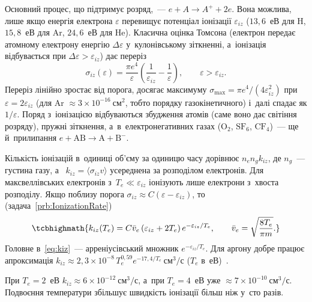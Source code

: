 Основний процес, що підтримує розряд,~--- 
$e+A\to A^++2e$. Вона можлива, лише якщо енергія електрона $\varepsilon$ перевищує
потенціал іонізації $\varepsilon_{iz}$ ($13{,}6$~еВ для H, $15{,}8$~еВ для Ar, $24{,}6$~еВ для He).
Класична оцінка Томсона (електрон передає атомному електрону енергію $\Delta\varepsilon$ у~кулонівському
зіткненні, а~іонізація відбувається при $\Delta\varepsilon>\varepsilon_{iz}$) дає переріз
\begin{equation}\label{eq:thomson-iz}
	\sigma_{iz}(\varepsilon)=\frac{\pi e^4}{\varepsilon}\left(\frac1{\varepsilon_{iz}}-\frac1\varepsilon\right),
	\qquad \varepsilon>\varepsilon_{iz}.
\end{equation}
Переріз лінійно зростає від порога, досягає максимуму
$\sigma_{\max}=\pi e^4/(4\varepsilon_{iz}^2)$ при $\varepsilon=2\varepsilon_{iz}$
(для Ar $\approx3\times10^{-16}~\mathrm{см}^2$, тобто порядку газокінетичного) і~далі спадає як $1/\varepsilon$.
Поряд з~іонізацією відбуваються збудження атомів (саме воно дає світіння розряду),
пружні зіткнення, а~в~електронегативних газах ($\mathrm{O_2}$, $\mathrm{SF_6}$, $\mathrm{CF_4}$)~--- ще й~прилипання
$e+\mathrm{AB}\to\mathrm A+\mathrm B^-$.

Кількість іонізацій в~одиниці об'єму за одиницю часу дорівнює $n_en_gk_{iz}$, де $n_g$~---
густина газу, а~ $k_{iz}=\langle\sigma_{iz}v\rangle$ усереднена за
розподілом електронів. Для максвеллівських електронів з~$T_e\ll\varepsilon_{iz}$ іонізують лише
електрони з~хвоста розподілу. Якщо поблизу порога $\sigma_{iz}\approx C(\varepsilon-\varepsilon_{iz})$, то
(задача~\ref{prb:IonizationRate})
\begin{equation}\label{eq:kiz}
	\tcbhighmath{k_{iz}(T_e)=C\bar v_e\,(\varepsilon_{iz}+2T_e)\,e^{-\varepsilon_{iz}/T_e},\qquad \bar v_e=\sqrt{\frac{8T_e}{\pi m}}.}
\end{equation}
Головне в~\eqref{eq:kiz}~--- арреніусівський множник $e^{-\varepsilon_{iz}/T_e}$. Для аргону
добре працює апроксимація $k_{iz}\approx2{,}3\times10^{-8}\,T_e^{0{,}59}e^{-17{,}4/T_e}~\mathrm{см}^3/\mathrm{с}$
($T_e$ в~еВ)~\cite{lieberman2005principles}.

\begin{Estimate}
При $T_e=2$~еВ $k_{iz}\approx6\times10^{-12}~\mathrm{см}^3/\mathrm{с}$, а~при
$T_e=4$~еВ уже $\approx7\times10^{-10}~\mathrm{см}^3/\mathrm{с}$. Подвоєння температури збільшує
швидкість іонізації більш ніж у~сто разів.
\end{Estimate}

